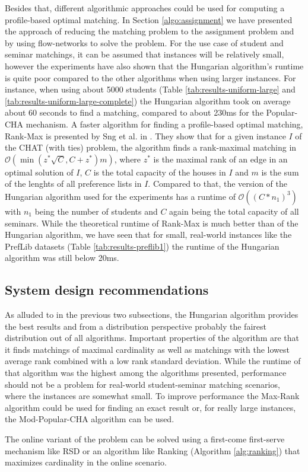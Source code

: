 Besides that, different algorithmic approaches could be used for computing a profile-based optimal matching. In Section \ref{algo:assignment} we have presented the approach of reducing the matching problem to the assignment problem and by using flow-networks to solve the problem. For the use case of student and seminar matchings, it can be assumed that instances will be relatively small, however the experiments have also shown that the Hungarian algorithm's runtime is quite poor compared to the other algorithms when using larger instances. For instance, when using about 5000 students (Table \ref{tab:results-uniform-large} and \ref{tab:results-uniform-large-complete})
the Hungarian algorithm took on average about 60 seconds to find a matching, compared to about 230ms for the Popular-CHA mechanism. A faster algorithm for finding a profile-based optimal matching, Rank-Max is presented by Sng et al. in \cite{SngThesis}. They show that for a given instance $I$ of the CHAT (with ties) problem, the algorithm finds a rank-maximal matching in $\mathcal{O}(\min(z^*\sqrt{C}, C + z^*)m)$, where $z^*$ is the maximal rank of an edge in an optimal solution of $I$, $C$ is the total capacity of the houses in $I$ and $m$ is the sum of the lenghts of all preference lists in $I$. Compared to that, the version of the Hungarian algorithm used for the experiments has a runtime of $\mathcal{O}((C*n_1)^3)$ with $n_1$ being the number of students and $C$ again being the total capacity of all seminars. While the theoretical runtime of Rank-Max is much better than of the Hungarian algorithm, we have seen that for small, real-world instances like the PrefLib datasets (Table \ref{tab:results-preflib1}) the runtime of the Hungarian algorithm was still below 20ms.

\subsection{System design recommendations}
As alluded to in the previous two subsections, the Hungarian algorithm provides the best results and from a distribution perspective probably the fairest distribution out of all algorithms. Important properties of the algorithm are that it finds matchings of maximal cardinality as well as matchings with the lowest average rank combined with a low rank standard deviation. While the runtime of that algorithm was the highest among the algorithms presented, performance should not be a problem for real-world student-seminar matching scenarios, where the instances are somewhat small. To improve performance the Max-Rank algorithm \cite{SngThesis} could be used for finding an exact result or, for really large instances, the Mod-Popular-CHA algorithm can be used.

The online variant of the problem can be solved using a first-come first-serve mechanism like RSD or an algorithm like Ranking (Algorithm \ref{alg:ranking}) that maximizes cardinality in the online scenario.